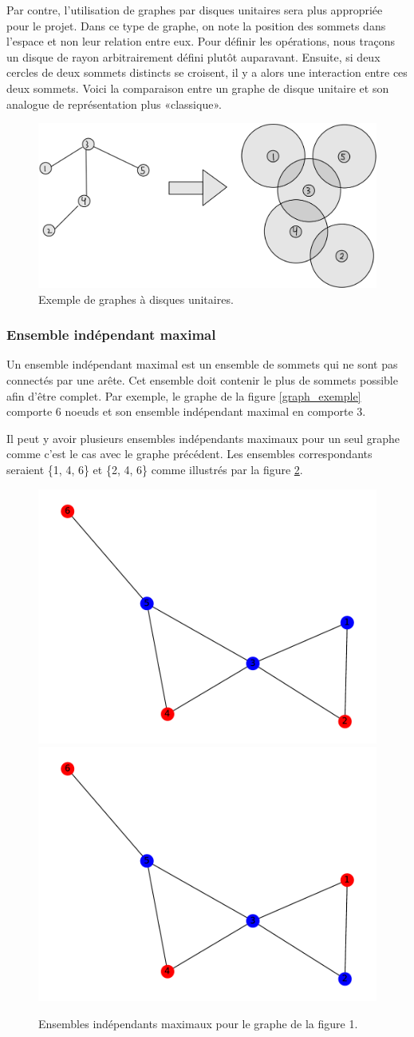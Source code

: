 \documentclass[11pt]{article}
\begin{document}
Par contre, l'utilisation de graphes par disques unitaires sera plus appropriée pour le projet. Dans ce type de graphe, on note la position des sommets dans l'espace et non leur relation entre eux. Pour définir les opérations, nous traçons un disque de rayon arbitrairement défini plutôt auparavant. Ensuite, si deux cercles de deux sommets distincts se croisent, il y a alors une interaction entre ces deux sommets. Voici la comparaison entre un graphe de disque unitaire et son analogue de représentation plus «classique». 
\begin{figure}[H]
    \centering
        \includegraphics[width=0.45\linewidth]{images/disk_ex.jpg}
        \caption{Exemple de graphes à disques unitaires.}
    \label{disk_example}
\end{figure}
\subsubsection{Ensemble indépendant maximal}
Un ensemble indépendant maximal est un ensemble de sommets qui ne sont pas connectés par une arête. Cet ensemble doit contenir le plus de sommets possible afin d'être complet. Par exemple, le graphe de la figure \ref{graph_exemple} comporte 6 noeuds et son ensemble indépendant maximal en comporte 3.
 
Il peut y avoir plusieurs ensembles indépendants maximaux pour un seul graphe comme c'est le cas avec le graphe précédent. Les ensembles correspondants seraient \{1, 4, 6\} et \{2, 4, 6\} comme illustrés par la figure \ref{MIS_exemple}.

\begin{figure}[H]
    \centering
    \includegraphics[width=0.4\linewidth]{images/graphe_MIS_1.pdf}
    \includegraphics[width=0.4\linewidth]{images/graphe_MIS_2.pdf}
    \caption{Ensembles indépendants maximaux pour le graphe de la figure 1.}
    \label{MIS_exemple}
\end{figure}
\end{document}
